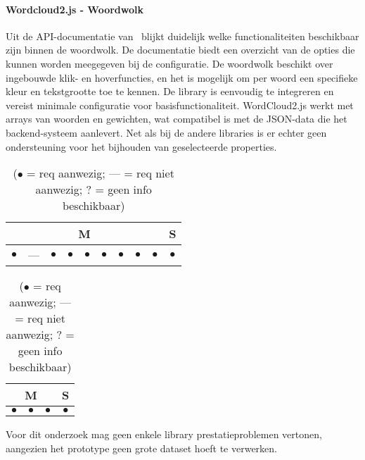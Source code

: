 \paragraph{Wordcloud2.js - Woordwolk}
Uit de API-documentatie van~\textcite{Chien2011a} blijkt duidelijk welke functionaliteiten beschikbaar zijn binnen de woordwolk. De documentatie biedt een overzicht van de opties die kunnen worden meegegeven bij de configuratie. De woordwolk beschikt over ingebouwde klik- en hoverfuncties, en het is mogelijk om per woord een specifieke kleur en tekstgrootte toe te kennen. De library is eenvoudig te integreren en vereist minimale configuratie voor basisfunctionaliteit. WordCloud2.js werkt met arrays van woorden en gewichten, wat compatibel is met de JSON-data die het backend-systeem aanlevert. Net als bij de andere libraries is er echter geen ondersteuning voor het bijhouden van geselecteerde properties.
\begin{table}[htbp]
    \centering
    \begin{minipage}{0.48\textwidth}
        \centering
        \begin{tabular}{|ccccccccc|c|}
            \hline
            \multicolumn{9}{|c|}{M} & \multicolumn{1}{c|}{S} \\
            \midrule
            $\bullet$ & --- & $\bullet$ & $\bullet$ & $\bullet$ & $\bullet$ & $\bullet$ & $\bullet$ & $\bullet$ & $\bullet$ \\
            \bottomrule
        \end{tabular}
        \caption{Wordcloud2.js Woordwolk - Functionele requirements}
    \end{minipage}
    \hfill
    \begin{minipage}{0.48\textwidth}
        \centering
        \begin{tabular}{|ccc|c|}
            \hline
            \multicolumn{3}{|c|}{M} & \multicolumn{1}{c|}{S} \\
            \midrule
            $\bullet$ & $\bullet$ & $\bullet$ & $\bullet$ \\
            \bottomrule
        \end{tabular}
        \caption{Wordcloud2.js Woordwolk - Niet-functionele requirements}
    \end{minipage}
    \caption*{($\bullet$ = req aanwezig; --- = req niet aanwezig; ? = geen info beschikbaar)}
\end{table}
\medskip\par Voor dit onderzoek mag geen enkele library prestatieproblemen vertonen, aangezien het prototype geen grote dataset hoeft te verwerken.

